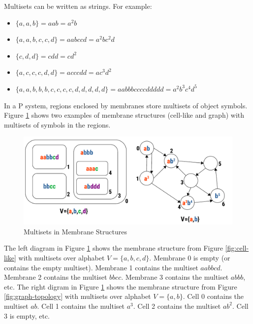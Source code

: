 \documentclass{article}
\begin{document}
Multisets can be written as strings. For example:

\begin{itemize}
\item $\{a,a,b\} = aab = a^2b$
\item $\{a,a,b,c,c,d\} = aabccd = a^2bc^2d$
\item $\{c,d,d\} = cdd = cd^2$
\item $\{a,c,c,c,d,d\} = acccdd = ac^3d^2$
\item $\{a,a,b,b,b,c,c,c,c,d,d,d,d,d\}= aabbbccccddddd=a^2b^3c^4d^5$
\end{itemize}

In a P system, regions enclosed by membranes store multisets of object symbols. Figure 
\ref{fig:multisets-on-membranes} shows two examples of membrane structures (cell-like and graph) 
with multisets of symbols in the  regions.

\begin{figure}[H]
\begin{center}
\includegraphics[scale=0.55]{figures/zzz-multisets-on-membranes.pdf}
\caption{Multisets in Membrane Structures}
\label{fig:multisets-on-membranes}
\end{center}
\end{figure}

The left diagram in Figure \ref{fig:multisets-on-membranes} shows the membrane structure from Figure
\ref{fig:cell-like} with multisets over alphabet $V=\{a,b,c,d\}$. Membrane 0 is empty (or contains 
the empty multiset). Membrane 1 contains the multiset $aabbcd$. Membrane 2 contains the multiset
$bbcc$. Membrane 3 contains the multiset $abbb$, etc. The right digram in Figure 
\ref{fig:multisets-on-membranes} shows the membrane structure from Figure \ref{fig:graph-topology} 
with multisets over alphabet $V=\{a,b\}$. Cell 0 contains the multiset $ab$. Cell 1 contains the 
multiset $a^3$. Cell 2 contains the multiset $ab^2$. Cell 3 is empty, etc. 


\end{document}
